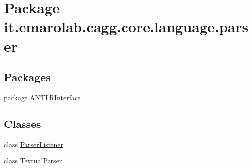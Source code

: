 \hypertarget{namespaceit_1_1emarolab_1_1cagg_1_1core_1_1language_1_1parser}{\section{Package it.\-emarolab.\-cagg.\-core.\-language.\-parser}
\label{namespaceit_1_1emarolab_1_1cagg_1_1core_1_1language_1_1parser}
}
\subsection*{Packages}
\begin{DoxyCompactItemize}
\item 
package \hyperlink{namespaceit_1_1emarolab_1_1cagg_1_1core_1_1language_1_1parser_1_1ANTLRInterface}{A\-N\-T\-L\-R\-Interface}
\end{DoxyCompactItemize}
\subsection*{Classes}
\begin{DoxyCompactItemize}
\item 
class \hyperlink{classit_1_1emarolab_1_1cagg_1_1core_1_1language_1_1parser_1_1ParserListener}{Parser\-Listener}
\item 
class \hyperlink{classit_1_1emarolab_1_1cagg_1_1core_1_1language_1_1parser_1_1TextualParser}{Textual\-Parser}
\end{DoxyCompactItemize}
